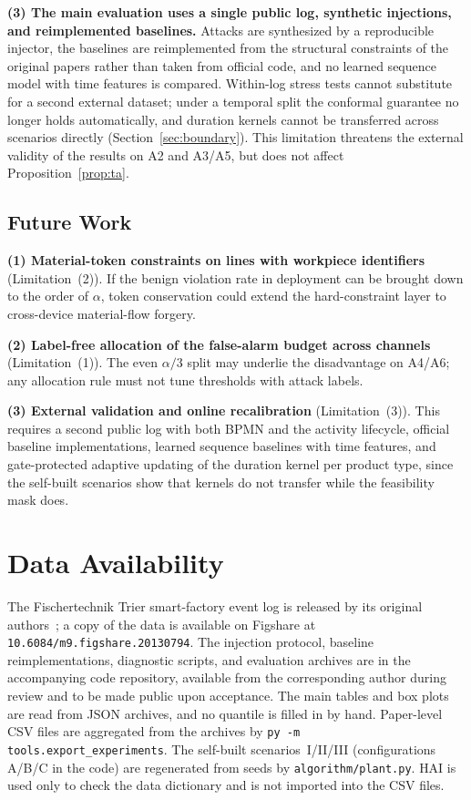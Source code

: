 \documentclass[manuscript,screen,review]{acmart}
\begin{document}
\textbf{(3) The main evaluation uses a single public log, synthetic injections, and reimplemented baselines.}
Attacks are synthesized by a reproducible injector, the baselines are reimplemented from the structural constraints of the original papers rather than taken from official code, and no learned sequence model with time features is compared. Within-log stress tests cannot substitute for a second external dataset; under a temporal split the conformal guarantee no longer holds automatically, and duration kernels cannot be transferred across scenarios directly (Section~\ref{sec:boundary}). This limitation threatens the external validity of the results on {A2} and {A3}/{A5}, but does not affect Proposition~\ref{prop:ta}.

\subsection{Future Work}
\label{sec:future_work}

\textbf{(1) Material-token constraints on lines with workpiece identifiers} (Limitation~(2)). If the benign violation rate in deployment can be brought down to the order of $\alpha$, token conservation could extend the hard-constraint layer to cross-device material-flow forgery.

\textbf{(2) Label-free allocation of the false-alarm budget across channels} (Limitation~(1)). The even $\alpha/3$ split may underlie the disadvantage on {A4}/{A6}; any allocation rule must not tune thresholds with attack labels.

\textbf{(3) External validation and online recalibration} (Limitation~(3)). This requires a second public log with both {BPMN} and the activity lifecycle, official baseline implementations, learned sequence baselines with time features, and gate-protected adaptive updating of the duration kernel per product type, since the self-built scenarios show that kernels do not transfer while the feasibility mask does.

\section{Data Availability}
\label{sec:data}

The {Fischertechnik} {Trier} smart-factory event log is released by its original authors~\cite{malburg2022trier}; a copy of the data is available on {Figshare} at \texttt{10.6084/m9.figshare.20130794}. The injection protocol, baseline reimplementations, diagnostic scripts, and evaluation archives are in the accompanying code repository, available from the corresponding author during review and to be made public upon acceptance. The main tables and box plots are read from JSON archives, and no quantile is filled in by hand. Paper-level {CSV} files are aggregated from the archives by \texttt{py -m tools.export\_experiments}. The self-built scenarios~I/II/III (configurations {A}/{B}/{C} in the code) are regenerated from seeds by \texttt{algorithm/plant.py}. {HAI} is used only to check the data dictionary and is not imported into the {CSV} files.
\end{document}
